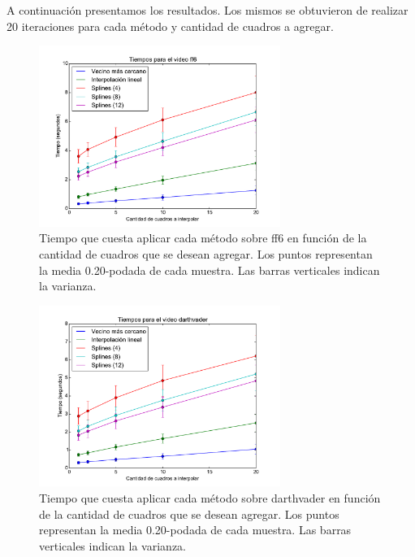 A continuación presentamos los resultados. Los mismos se obtuvieron de realizar 20 iteraciones para cada método y cantidad de cuadros a agregar.
\begin{figure}[H]
 \centering
	\includegraphics[width=0.7\textwidth]{imgs/resultados_tiempos/ff6_times.pdf}
	\caption{\footnotesize Tiempo que cuesta aplicar cada método sobre ff6 en función de la cantidad de cuadros que se desean agregar. Los puntos representan la media 0.20-podada de cada muestra. Las barras verticales indican la varianza.}
	\label{fig:ff6-times}
\end{figure}

\begin{figure}[H]
 \centering
	\includegraphics[width=0.7\textwidth]{imgs/resultados_tiempos/darthvader_times.pdf}
    \caption{\footnotesize Tiempo que cuesta aplicar cada método sobre darthvader en función de la cantidad de cuadros que se desean agregar. Los puntos representan la media 0.20-podada de cada muestra. Las barras verticales indican la varianza.}
    \label{fig:darthvader-times}
\end{figure}

